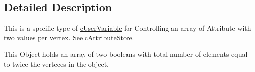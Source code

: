 \subsection{Detailed Description}
This is a specific type of \hyperlink{classc_user_variable}{cUserVariable} for Controlling an array of Attribute with two values per vertex. See \hyperlink{classc_attribute_store}{cAttributeStore}. 

This Object holds an array of two booleans with total number of elements equal to twice the verteces in the object. 